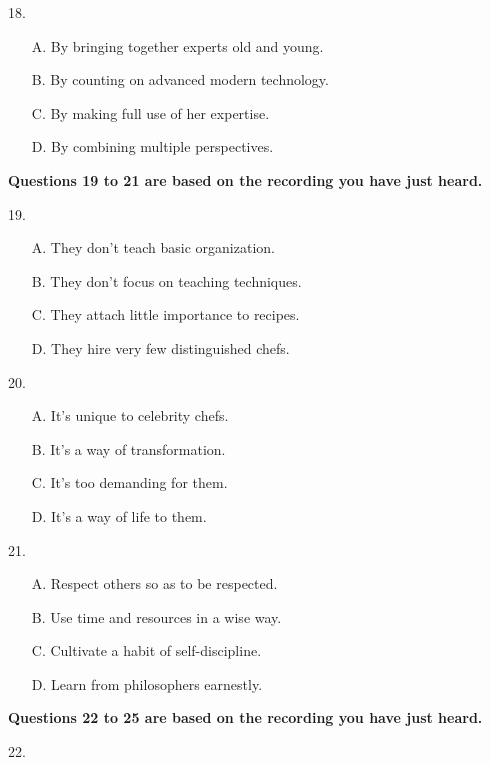 \documentclass[UTF8,11pt]{ctexart}
\begin{document}
18.


\begin{itemize}[leftmargin=2em,itemsep=.2em,topsep=.4em]\item[A.] By bringing together experts old and young.
\item[B.] By counting on advanced modern technology.
\item[C.] By making full use of her expertise.
\item[D.] By combining multiple perspectives.
\end{itemize}

\textbf{Questions 19 to 21 are based on the recording you have just heard.}


19.


\begin{itemize}[leftmargin=2em,itemsep=.2em,topsep=.4em]\item[A.] They don’t teach basic organization.
\item[B.] They don’t focus on teaching techniques.
\item[C.] They attach little importance to recipes.
\item[D.] They hire very few distinguished chefs.
\end{itemize}

20.


\begin{itemize}[leftmargin=2em,itemsep=.2em,topsep=.4em]\item[A.] It’s unique to celebrity chefs.
\item[B.] It’s a way of transformation.
\item[C.] It’s too demanding for them.
\item[D.] It’s a way of life to them.
\end{itemize}

21.


\begin{itemize}[leftmargin=2em,itemsep=.2em,topsep=.4em]\item[A.] Respect others so as to be respected.
\item[B.] Use time and resources in a wise way.
\item[C.] Cultivate a habit of self-discipline.
\item[D.] Learn from philosophers earnestly.
\end{itemize}

\textbf{Questions 22 to 25 are based on the recording you have just heard.}


22.
\end{document}
